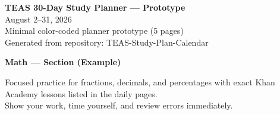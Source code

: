 \documentclass[11pt,a4paper]{article}
\newcommand{\SectionDivider}[2]{%
  \vspace*{6mm}
  \noindent\colorbox{#1}{\parbox{\linewidth}{\vspace{6pt}\centering\Large\bfseries\color{white}#2\vspace{6pt}}}
  \vspace{6mm}
}
\begin{document}
\begin{center}
  {\LARGE\bfseries TEAS 30-Day Study Planner — Prototype}\\[8pt]
  {\large August 2–31, 2026}\\[16pt]
  {\normalsize Minimal color-coded planner prototype (5 pages)}\\[12pt]
  \vfill
  {\small Generated from repository: TEAS-Study-Plan-Calendar}
\end{center}
\newpage

\SectionDivider{mathcolor}{Math — Section (Example)}
 Focused practice for fractions, decimals, and percentages with exact Khan Academy lessons listed in the daily pages.\\
\vspace{6mm}
 Show your work, time yourself, and review errors immediately.\\
\newpage
\end{document}
